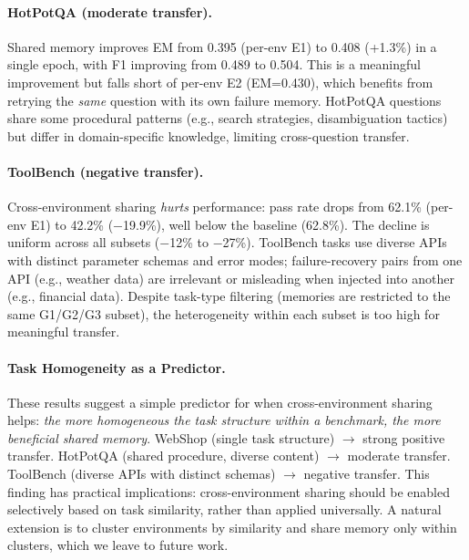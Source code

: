 \paragraph{HotPotQA (moderate transfer).} Shared memory improves EM from 0.395 (per-env E1) to 0.408 (+1.3\%) in a single epoch, with F1 improving from 0.489 to 0.504. This is a meaningful improvement but falls short of per-env E2 (EM=0.430), which benefits from retrying the \emph{same} question with its own failure memory. HotPotQA questions share some procedural patterns (e.g., search strategies, disambiguation tactics) but differ in domain-specific knowledge, limiting cross-question transfer.

\paragraph{ToolBench (negative transfer).} Cross-environment sharing \emph{hurts} performance: pass rate drops from 62.1\% (per-env E1) to 42.2\% ($-$19.9\%), well below the baseline (62.8\%). The decline is uniform across all subsets ($-$12\% to $-$27\%). ToolBench tasks use diverse APIs with distinct parameter schemas and error modes; failure-recovery pairs from one API (e.g., weather data) are irrelevant or misleading when injected into another (e.g., financial data). Despite task-type filtering (memories are restricted to the same G1/G2/G3 subset), the heterogeneity within each subset is too high for meaningful transfer.

\paragraph{Task Homogeneity as a Predictor.} These results suggest a simple predictor for when cross-environment sharing helps: \emph{the more homogeneous the task structure within a benchmark, the more beneficial shared memory}. WebShop (single task structure) $\to$ strong positive transfer. HotPotQA (shared procedure, diverse content) $\to$ moderate transfer. ToolBench (diverse APIs with distinct schemas) $\to$ negative transfer. This finding has practical implications: cross-environment sharing should be enabled selectively based on task similarity, rather than applied universally. A natural extension is to cluster environments by similarity and share memory only within clusters, which we leave to future work.
